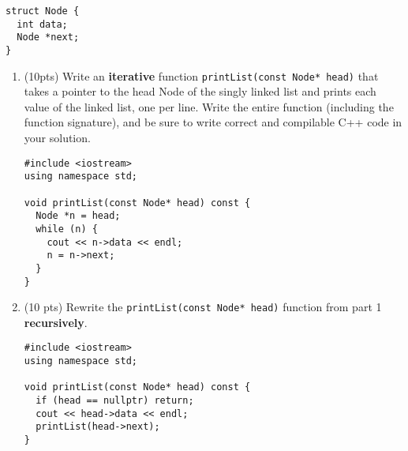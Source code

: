 \documentclass[11pt]{article}
\begin{document}
\begin{verbatim}
struct Node {
  int data;
  Node *next;
}
\end{verbatim}
\begin{enumerate}
\item (10pts) Write an \textbf{iterative} function \texttt{printList(const Node* head)} that takes a
pointer to the head Node of the singly linked list and prints each value of
the linked list, one per line. Write the entire function (including the
function signature), and be sure to write correct and compilable C++ code
in your solution.
\begin{verbatim}
#include <iostream>
using namespace std;

void printList(const Node* head) const {
  Node *n = head;
  while (n) {
    cout << n->data << endl;
    n = n->next;
  }
}
\end{verbatim}
\vspace{5em}

\item (10 pts) Rewrite the \texttt{printList(const Node* head)} function from part 1
\textbf{recursively}.
\begin{verbatim}
#include <iostream>
using namespace std;

void printList(const Node* head) const {
  if (head == nullptr) return;
  cout << head->data << endl;
  printList(head->next);
}

\end{verbatim}
\end{enumerate}
\end{document}
